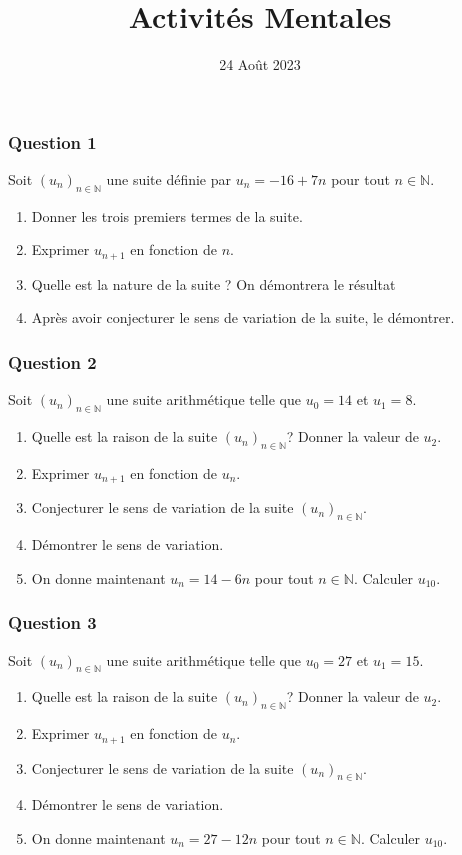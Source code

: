 \documentclass[15pt, mathserif]{beamer}
\title{Activités Mentales}
\date{24 Août 2023}
\newcommand{\N}{\mathbb{N}}			%
\newcommand{\st}[1]{$(#1_n)_{n \in \N}$}
\begin{document}
\begin{frame}
    \titlepage
\end{frame}

\begin{frame} 
	\frametitle{Question 1}
Soit \st{u} une suite définie par $u_n=-16+7n$ pour tout $n \in \N$. 
 
 \begin{enumerate} 
 	 \item Donner les trois premiers termes de la suite. 
 	 \item Exprimer $u_{n+1}$ en fonction de $n$. 
 	 \item Quelle est la nature de la suite ? On démontrera le résultat 
 	 \item Après avoir conjecturer le sens de variation de la suite, le démontrer. 
 
 \end{enumerate} \end{frame}


\begin{frame} 
	\frametitle{Question 2}
Soit \st{u} une suite arithmétique telle que $u_0=14$ et $u_1=8$. 
 
 \begin{enumerate} 
 	 \item Quelle est la raison de la suite \st{u}? Donner la valeur de $u_2$. 
 	 \item Exprimer $u_{n+1}$ en fonction de $u_n$. 
 	 \item Conjecturer le sens de variation de la suite \st{u}. 
 	 \item Démontrer le sens de variation. 
 	 \item On donne maintenant $u_n=14-6n$ pour tout $n \in \N$. Calculer $u_{10}$. 
 
 \end{enumerate} \end{frame}


\begin{frame} 
	\frametitle{Question 3}
Soit \st{u} une suite arithmétique telle que $u_0=27$ et $u_1=15$. 
 
 \begin{enumerate} 
 	 \item Quelle est la raison de la suite \st{u}? Donner la valeur de $u_2$. 
 	 \item Exprimer $u_{n+1}$ en fonction de $u_n$. 
 	 \item Conjecturer le sens de variation de la suite \st{u}. 
 	 \item Démontrer le sens de variation. 
 	 \item On donne maintenant $u_n=27-12n$ pour tout $n \in \N$. Calculer $u_{10}$. 
 
 \end{enumerate} \end{frame}
\end{document}
